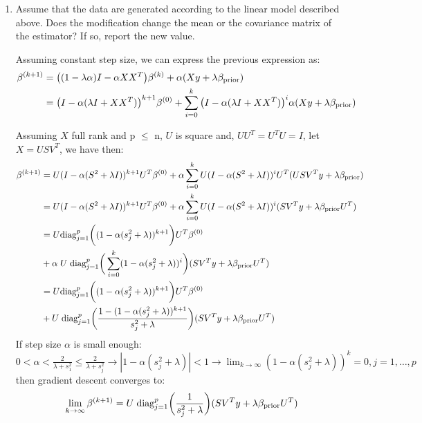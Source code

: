 \documentclass[12pt,twoside]{article}
\begin{document}
\begin{enumerate}
\begin{enumerate}
    \item Assume that the data are generated according to the linear model described above. Does the modification change the mean or the covariance matrix of the estimator? If so, report the new value.\\
    
\medskip

Assuming constant step size, we can express the previous expression as:
\begin{align*}
		\beta^{(k+1)}	&=	\big( (1 - \lambda \alpha)  I - \alpha X X^T \big) \beta^{(k)}		+  	\alpha (X y + \lambda \beta_{\operatorname{prior}}) \\
					&=	\big(I - \alpha (\lambda I + X X^T)  \big)^{k+1} \beta^{(0)}		+	\sum_{i=0}^k \big(I - \alpha (\lambda I + X X^T)  \big)^i \alpha (X y + \lambda \beta_{\operatorname{prior}})
\end{align*}

Assuming $X$ full rank and p $\le$ n, $U$ is square and, $UU^T = U^TU = I$, let $X = USV^T$, we have then:
\begin{align*}
		\beta^{(k+1)}	&=	U (I - \alpha (S^2 + \lambda I))^{k+1} U^T \beta^{(0)}		+ \alpha \sum_{i=0}^k 	U (I - \alpha (S^2 + \lambda I))^ i U^T (U S V^T y +  \lambda \beta_{\operatorname{prior}}) \\
					&=	U (I - \alpha (S^2 + \lambda I))^{k+1} U^T \beta^{(0)}		+ \alpha \sum_{i=0}^k 	U (I - \alpha (S^2 + \lambda I))^ i (S V^T y + \lambda \beta_{\operatorname{prior}}  U^T) \\
					&=	U \text{diag}_{j=1}^p \bigg( (1 - \alpha (s_j^2 + \lambda))^{k+1} \bigg)U^T \beta^{(0)}	\\
					&+ \alpha \; U  \;  \text{diag}_{j=1}^p \bigg( \sum_{i=0}^k (1 - \alpha (s_j^2 + \lambda))^i \bigg)  (S V^T y + \lambda \beta_{\operatorname{prior}}  U^T) \\
					&= U \text{diag}_{j=1}^p \bigg( (1 - \alpha (s_j^2 + \lambda))^{k+1} \bigg)U^T \beta^{(0)}	\\
					&+ U  \;  \text{diag}_{j=1}^p \bigg( \frac{ 1 - (1 - \alpha (s_j^2 + \lambda))^{k+1}} {s_j^2 + \lambda} \bigg)  (S V^T y + \lambda \beta_{\operatorname{prior}}  U^T)
\end{align*}
If step size $\alpha$ is small enough: $0 < \alpha < \frac{2} {\lambda + s_1^2} \le \frac{2} {\lambda + s_j^2} \rightarrow |1 - \alpha (s_j^2 + \lambda)| < 1 \rightarrow \lim_{k \rightarrow \infty} (1 - \alpha (s_j^2 + \lambda))^k =0, j=1, \dots ,p $ then gradient descent converges to:
$$\lim_{k \rightarrow \infty} \beta^{(k+1)} = U  \;  \text{diag}_{j=1}^p \bigg( \frac{1} {s_j^2 + \lambda} \bigg)  (S V^T y + \lambda \beta_{\operatorname{prior}}  U^T)$$


\end{enumerate}
\end{enumerate}
\end{document}
